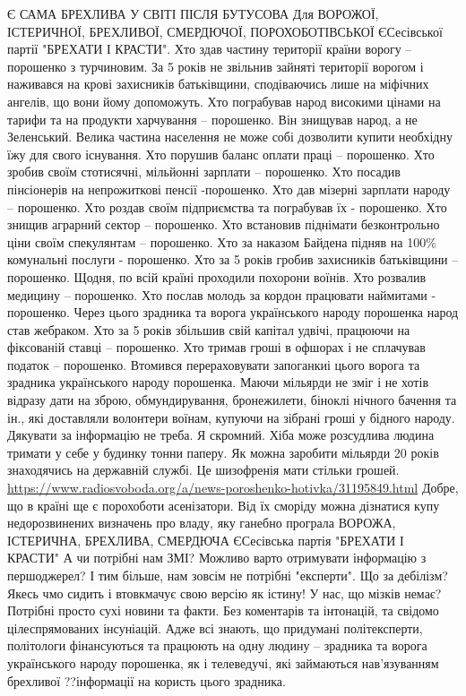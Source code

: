 \begin{itemize}
\obeycr
Є САМА БРЕХЛИВА У СВІТІ ПІСЛЯ БУТУСОВА
Для ВОРОЖОЇ, ІСТЕРИЧНОЇ, БРЕХЛИВОЇ, СМЕРДЮЧОЇ, ПОРОХОБОТІВСЬКОЇ ЄСесівської партії "БРЕХАТИ І КРАСТИ".
Хто здав частину території країни ворогу – порошенко з турчиновим.
За 5 років не звільнив зайняті території ворогом і наживався на крові захисників батьківщини, сподіваючись лише на міфічних ангелів, що вони йому допоможуть.
Хто пограбував народ високими цінами на тарифи та на продукти харчування – порошенко.
Він знищував народ, а не Зеленський.
Велика частина населення не може собі дозволити купити необхідну їжу для свого існування.
Хто порушив баланс оплати праці – порошенко.
Хто зробив своїм стотисячні, мільйонні зарплати – порошенко.
Хто посадив пінсіонерів на непрожиткові пенсії -порошенко.
Хто дав мізерні зарплати народу – порошенко.
Хто роздав своїм підприємства та пограбував їх - порошенко.
Хто знищив аграрний сектор – порошенко.
Хто встановив піднімати безконтрольно ціни своїм спекулянтам – порошенко.
Хто за наказом Байдена підняв на 100\% комунальні послуги - порошенко.
Хто за 5 років гробив захисників батьківщини – порошенко. Щодня, по всій країні проходили похорони воїнів.
Хто розвалив медицину – порошенко.
Хто послав молодь за кордон працювати наймитами - порошенко.
Через цього зрадника та ворога українського народу порошенка народ став жебраком.
Хто за 5 років збільшив свій капітал удвічі, працюючи на фіксованій ставці – порошенко.
Хто тримав гроші в офшорах і не сплачував податок – порошенко.
Втомився перераховувати запоганкиі цього ворога та зрадника українського народу порошенка.
Маючи мільярди не зміг і не хотів відразу дати на зброю, обмундирування, бронежилети, біноклі нічного бачення та ін., які доставляли волонтери воїнам, купуючи на зібрані гроші у бідного народу.
Дякувати за інформацію не треба. Я скромний.
Хіба може розсудлива людина тримати у себе у будинку тонни паперу.
Як можна заробити мільярди 20 років знаходячись на державній службі.
Це шизофренія мати стільки грошей. 
\url{https://www.radiosvoboda.org/a/news-poroshenko-hotivka/31195849.html}
Добре, що в країні ще є порохоботи асенізатори.
Від їх сморіду можна дізнатися купу недорозвинених визначень про владу, яку ганебно програла
ВОРОЖА, ІСТЕРИЧНА, БРЕХЛИВА, СМЕРДЮЧА ЄСесівська партія "БРЕХАТИ І КРАСТИ"
А чи потрібні нам ЗМІ?
Можливо варто отримувати інформацію з першоджерел? І тим більше, нам зовсім не потрібні "експерти". Що за дебілізм?
Якесь чмо сидить і втовкмачує свою версію як істину! У нас, що мізків немає?
Потрібні просто сухі новини та факти. Без коментарів та інтонацій, та свідомо цілеспрямованих інсуніацій.
Адже всі знають, що придумані політексперти, політологи фінансуються та працюють на одну людину – зрадника та ворога українського народу порошенка, як і телеведучі, які займаються нав'язуванням брехливої ??інформації на користь цього зрадника.

\end{itemize}
